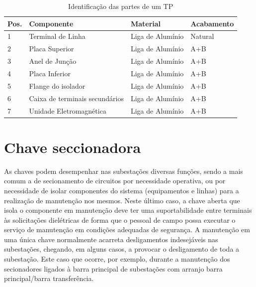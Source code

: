 \documentclass[a5paper,english,spanish,brazil]{ufsc-thesis}
\begin{document}
		\begin{longtable}{|l|l|l|l|}
		\caption{Identificação das partes de um TP}
		\\ \hline
		  Pos. & Componente & Material & Acabamento \\ \hline
		  1 & Terminal de Linha & Liga de Alumínio & Natural \\ \hline
		  2 & Placa Superior & Liga de Alumínio & A+B \\ \hline
		  3 & Anel de Junção & Liga de Alumínio & A+B \\ \hline
		  4 & Placa Inferior & Liga de Alumínio & A+B \\ \hline
		  5 & Flange do isolador & Liga de Alumínio & A+B \\ \hline
		  6 & Caixa de terminais secundários & Liga de Alumínio & A+B \\ \hline
		  7 & Unidade Eletromagnética & Liga de Alumínio & A+B \\ \hline
		\end{longtable}

	\section{Chave seccionadora}
		As chaves podem desempenhar nas subestações diversas funções, sendo a mais comum a de secionamento de circuitos por necessidade operativa, ou por necessidade de isolar componentes do sistema (equipamentos e linhas) para a realização de manutenção nos mesmos. Neste último caso, a chave aberta que isola o componente em manutenção deve ter uma suportabilidade entre terminais às solicitações dielétricas de forma que o pessoal de campo possa executar o serviço de manutenção em condições adequadas de segurança. A manutenção em uma única chave normalmente acarreta desligamentos indesejáveis nas subestações, chegando, em alguns casos, a provocar o desligamento de toda a subestação. Este caso que ocorre, por exemplo, durante a manutenção dos secionadores ligados à barra principal de subestações com arranjo barra principal/barra transferência.
\end{document}
